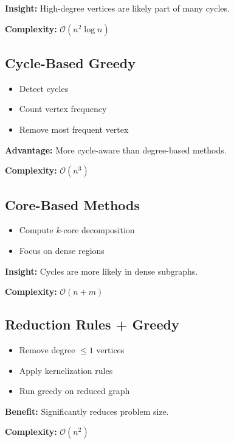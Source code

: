 \documentclass[10pt,a4paper]{report}
\theoremstyle{definition}
\newcommand{\bigO}[1]{\mathcal{O}\!\left(#1\right)}
\begin{document}
\textbf{Insight:} High-degree vertices are likely part of many cycles.

\textbf{Complexity:} $\bigO{n^2 \log n}$

\subsection{Cycle-Based Greedy}

\begin{itemize}
  \item Detect cycles
  \item Count vertex frequency
  \item Remove most frequent vertex
\end{itemize}

\textbf{Advantage:} More cycle-aware than degree-based methods.

\textbf{Complexity:} $\bigO{n^3}$

\subsection{Core-Based Methods}

\begin{itemize}
  \item Compute $k$-core decomposition
  \item Focus on dense regions
\end{itemize}

\textbf{Insight:} Cycles are more likely in dense subgraphs.

\textbf{Complexity:} $\bigO{n + m}$

\subsection{Reduction Rules + Greedy}

\begin{itemize}
  \item Remove degree $\leq 1$ vertices
  \item Apply kernelization rules
  \item Run greedy on reduced graph
\end{itemize}

\textbf{Benefit:} Significantly reduces problem size.

\textbf{Complexity:} $\bigO{n^2}$
\end{document}
